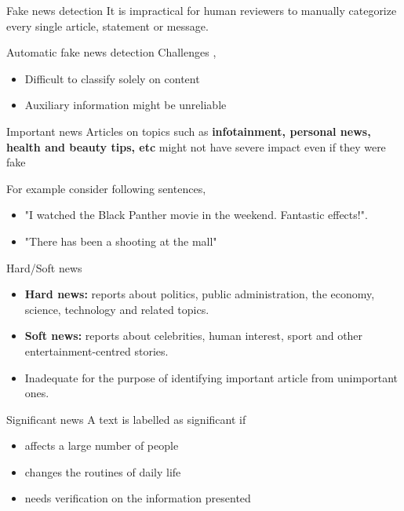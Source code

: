 \documentclass[12pt]{beamer}
\begin{document}
\begin{frame}{Fake news detection}
    It is impractical for human reviewers to manually categorize every single article, statement or message.
\end{frame}

\begin{frame}{Automatic fake news detection}
    Challenges \autocite{shu2017fake},
    \begin{itemize}
        \item Difficult to classify solely on content
        \item Auxiliary information might be unreliable
    \end{itemize}
\end{frame}

\begin{frame}{Important news}
    Articles on topics such as \textbf{infotainment, personal news, health and beauty tips, etc} might not have severe impact even if they were fake

    For example consider following sentences,
    \begin{itemize}
        \item "I watched the Black Panther movie in the weekend. Fantastic effects!". 
        \item "There has been a shooting at the mall"
    \end{itemize}
\end{frame}

\begin{frame}{Hard/Soft news}
    \begin{itemize}
        \item \textbf{Hard news:} reports about politics, public administration, the economy, science, technology and related topics. \autocite{reinemann2012hard}
        \item \textbf{Soft news:} reports about celebrities, human interest, sport and other entertainment-centred stories. \autocite{reinemann2012hard}
        \item Inadequate for the purpose of identifying important article from unimportant ones.
    \end{itemize}
\end{frame}

\begin{frame}{Significant news}
    A text is labelled as significant if \\
    \begin{itemize}
        \item affects a large number of people
        \item changes the routines of daily life
        \item needs verification on the information presented
    \end{itemize}
\end{frame}
\end{document}
